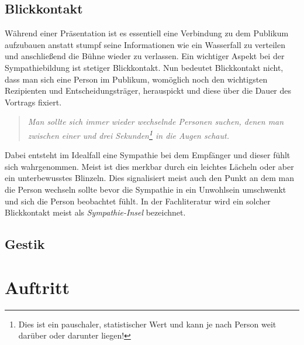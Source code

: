 \documentclass[../main.tex]{subfiles}
\begin{document}
        \subsection{Blickkontakt}\label{section:Seminar:RhetorikI:SympathieInsel}
            Während einer Präsentation ist es essentiell eine Verbindung zu dem Publikum aufzubauen anstatt stumpf seine Informationen wie ein Wasserfall zu verteilen und anschließend die Bühne wieder zu verlassen. Ein wichtiger Aspekt bei der Sympathiebildung ist stetiger Blickkontakt. Nun bedeutet Blickkontakt nicht, dass man sich eine Person im Publikum, womöglich noch den wichtigsten Rezipienten und Entscheidungsträger, herauspickt und diese über die Dauer des Vortrags fixiert. 
            \begin{quote}
                \emph{Man sollte sich immer wieder wechselnde Personen suchen, denen man zwischen einer und drei Sekunden\footnote{Dies ist ein pauschaler, statistischer Wert und kann je nach Person weit darüber oder darunter liegen!} in die Augen schaut.}
            \end{quote}
            Dabei entsteht im Idealfall eine Sympathie bei dem Empfänger und dieser fühlt sich wahrgenommen. Meist ist dies merkbar durch ein leichtes Lächeln oder aber ein unterbewusstes Blinzeln. Dies signalisiert meist auch den Punkt an dem man die Person wechseln sollte bevor die Sympathie in ein Unwohlsein umschwenkt und sich die Person beobachtet fühlt. In der Fachliteratur wird ein solcher Blickkontakt meist als \emph{Sympathie-Insel} bezeichnet.
            
        \subsection{Gestik}
            
            
    
    \section{Auftritt}
\end{document}
